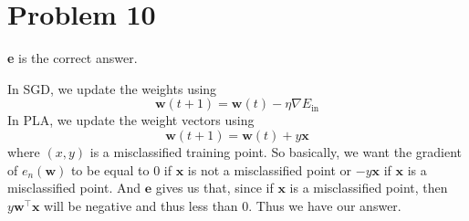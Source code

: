 \documentclass{article}
\begin{document}
\section*{Problem 10}
\textbf{e} is the correct answer.

\noindent In SGD, we update the weights using
\[ \mathbf{w}(t+1) = \mathbf{w}(t) - \eta \nabla E_{\text{in}} \]
In PLA, we update the weight vectors using
\[ \mathbf{w}(t+1) = \mathbf{w}(t) + y\mathbf{x} \]
where $(x,y)$ is a misclassified training point.
So basically, we want the gradient of $e_n(\mathbf{w})$ to be equal to
$0$ if $\mathbf{x}$ is not a misclassified point or $-y\mathbf{x}$ if $\mathbf{x}$
is a misclassified point. And $\textbf{e}$ gives us that, since if $\mathbf{x}$
is a misclassified point, then $y\mathbf{w}^{\intercal}\mathbf{x}$ will be negative
and thus less than 0. Thus we have our answer.
\end{document}

